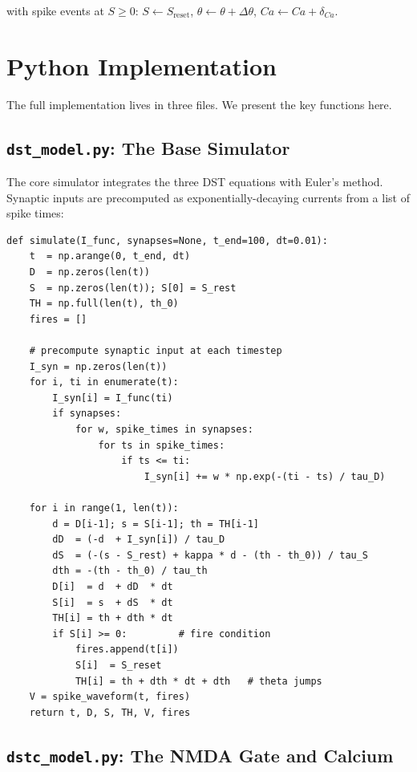 \documentclass[12pt]{article}
\begin{document}
\noindent with spike events at $S \geq 0$: $S \leftarrow S_{\text{reset}}$, $\theta \leftarrow \theta + \Delta\theta$, $Ca \leftarrow Ca + \delta_{Ca}$.

\section{Python Implementation}
\label{sec:code}

The full implementation lives in three files. We present the key functions here.

\subsection{\texttt{dst\_model.py}: The Base Simulator}

The core simulator integrates the three DST equations with Euler's method. Synaptic inputs are precomputed as exponentially-decaying currents from a list of spike times:

\begin{lstlisting}[caption={DST simulator core (\texttt{dst\_model.py})}, label={lst:dst}]
def simulate(I_func, synapses=None, t_end=100, dt=0.01):
    t  = np.arange(0, t_end, dt)
    D  = np.zeros(len(t))
    S  = np.zeros(len(t)); S[0] = S_rest
    TH = np.full(len(t), th_0)
    fires = []

    # precompute synaptic input at each timestep
    I_syn = np.zeros(len(t))
    for i, ti in enumerate(t):
        I_syn[i] = I_func(ti)
        if synapses:
            for w, spike_times in synapses:
                for ts in spike_times:
                    if ts <= ti:
                        I_syn[i] += w * np.exp(-(ti - ts) / tau_D)

    for i in range(1, len(t)):
        d = D[i-1]; s = S[i-1]; th = TH[i-1]
        dD  = (-d  + I_syn[i]) / tau_D
        dS  = (-(s - S_rest) + kappa * d - (th - th_0)) / tau_S
        dth = -(th - th_0) / tau_th
        D[i]  = d  + dD  * dt
        S[i]  = s  + dS  * dt
        TH[i] = th + dth * dt
        if S[i] >= 0:         # fire condition
            fires.append(t[i])
            S[i]  = S_reset
            TH[i] = th + dth * dt + dth   # theta jumps
    V = spike_waveform(t, fires)
    return t, D, S, TH, V, fires
\end{lstlisting}

\subsection{\texttt{dstc\_model.py}: The NMDA Gate and Calcium}
\end{document}

